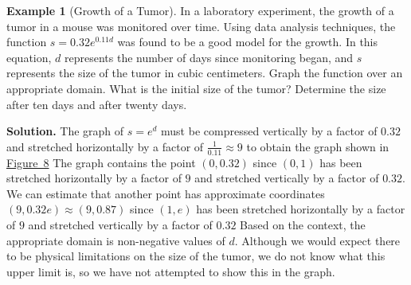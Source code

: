 \documentclass[10pt,]{book}
\theoremstyle{plain}
\theoremstyle{definition}
\theoremstyle{definition}
\newtheorem{example}[theorem]{Example}
\theoremstyle{definition}
\numberwithin{equation}{section}
\begin{document}
\begin{example}[Growth of a Tumor]\label{example-16}
\hypertarget{p-240}{}%
In a laboratory experiment, the growth of a tumor in a mouse was monitored over time.  Using data analysis techniques, the function \(s = 0.32e^{0.11d}\) was found to be a good model for the growth.  In this equation, \(d\) represents the number of days since monitoring began, and \(s\) represents the size of the tumor in cubic centimeters. Graph the function over an appropriate domain.  What is the initial size of the tumor? Determine the size after ten days and after twenty days.%
\par\smallskip%
\noindent\textbf{Solution.}\hypertarget{solution-16}{}\quad%
\hypertarget{p-241}{}%
The graph of  \(s=e^d\) must be compressed vertically by a factor of \(0.32\) and stretched horizontally by a factor of \(\frac{1}{0.11} \approx 9\) to obtain the graph shown in \hyperref[figure-tumor-graph]{Figure~8}  The graph contains the point \((0,0.32)\) since \((0,1)\) has been stretched horizontally by a factor of \(9\) and stretched vertically by a factor of \(0.32\).  We can estimate that another point has approximate coordinates \((9,0.32e) \approx (9,0.87)\) since \((1,e)\) has been stretched horizontally by a factor of \(9\) and stretched vertically by a factor of \(0.32\) Based on the context, the appropriate domain is non-negative values of \(d\). Although we would expect there to be physical limitations on the size of the tumor, we do not know what this upper limit is, so we have not attempted to show this in the graph. \begin{figure}
\centering
{
}
\end{figure}
\end{example}
\end{document}
